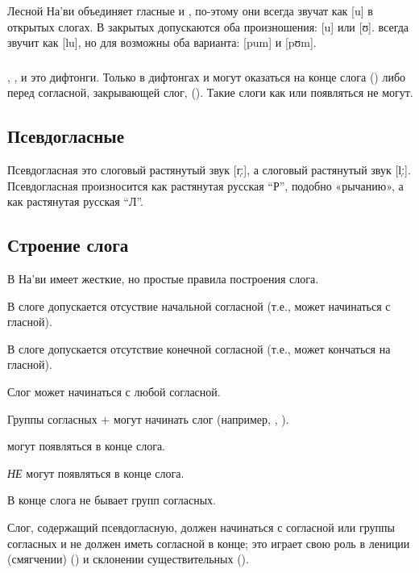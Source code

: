\subsubsection{} Лесной На'ви объединяет гласные  и , 
по-этому они всегда звучат как [u] в открытых слогах. В закрытых допускаются оба произношения: [u]
или [ʊ].   всегда звучит как [lu],
но для  возможны оба варианта: [pum] и [pʊm].


\subsubsection{}  , ,  и  это дифтонги.
Только в дифтонгах  и  могут оказаться на конце слога () либо перед согласной, закрывающей слог, (). Такие слоги как  или  появляться не могут.

\subsection{Псевдогласные} Псевдогласная  это слоговый растянутый звук [r̩ː], а  слоговый растянутый звук [l̩ː]. Псевдогласная  произносится как растянутая русская ``Р'', подобно «рычанию», а  как растянутая русская ``Л''.

\subsection{Строение слога}
 В На'ви имеет жесткие, но простые правила построения слога.

\begin{itemize*}
  \item В слоге допускается отсуствие начальной согласной (т.е., может начинаться с гласной).
  \item В слоге допускается отсутствие конечной согласной (т.е., может кончаться на гласной).
  \item Слог может начинаться с любой согласной.
  \item Группы согласных  $+$  могут начинать слог (например, , ).
  \item {} могут появляться в конце слога.
  \item {}  \textit{НЕ} могут появляться в конце слога.
  \item В конце слога не бывает групп согласных.
  \item \label{l-and-s:pseudo-no-null} Слог, содержащий псевдогласную, должен начинаться с согласной или группы согласных и не должен иметь согласной в конце; это играет свою роль в лениции (смягчении)
    () и склонении существительных
    ().
\end{itemize*}

